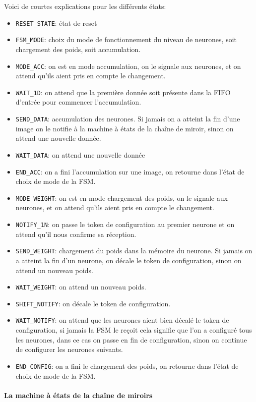 Voici de courtes explications pour les différents états:
\begin{itemize}
	\item \verb+RESET_STATE+: état de reset
	\item \verb+FSM_MODE+: choix du mode de fonctionnement du niveau de
		neurones, soit chargement des poids, soit accumulation.
	\item \verb+MODE_ACC+: on est en mode accumulation, on le signale aux
		neurones, et on attend qu'ils aient pris en compte le changement.
	\item \verb+WAIT_1D+: on attend que la première donnée soit présente
		dans la FIFO d'entrée pour commencer l'accumulation.
	\item \verb+SEND_DATA+: accumulation des neurones. Si jamais on a atteint
		la fin d'une image on le notifie à la machine à états de la
		chaîne de miroir, sinon on attend une nouvelle donnée.
	\item \verb+WAIT_DATA+: on attend une nouvelle donnée
	\item \verb+END_ACC+: on a fini l'accumulation sur une image, on retourne
		dans l'état de choix de mode de la FSM.
	\item \verb+MODE_WEIGHT+: on est en mode chargement des poids, on le signale aux
		neurones, et on attend qu'ils aient pris en compte le changement.
	\item \verb+NOTIFY_1N+: on passe le token de configuration au premier neurone
		et on attend qu'il nous confirme sa réception.
	\item \verb+SEND_WEIGHT+: chargement du poids dans la mémoire du neurone.
		Si jamais on a atteint la fin d'un neurone, on décale le token
		de configuration, sinon on attend un nouveau poids.
	\item \verb+WAIT_WEIGHT+: on attend un nouveau poids.
	\item \verb+SHIFT_NOTIFY+: on décale le token de configuration.
	\item \verb+WAIT_NOTIFY+: on attend que les neurones aient bien décalé
		le token de configuration, si jamais la FSM le reçoit cela signifie
		que l'on a configuré tous les neurones, dans ce cas on passe en
		fin de configuration, sinon on continue de configurer les neurones suivants.
	\item \verb+END_CONFIG+: on a fini le chargement des poids, on retourne
		dans l'état de choix de mode de la FSM.
\end{itemize}


\paragraph{La machine à états de la chaîne de miroirs\\}

